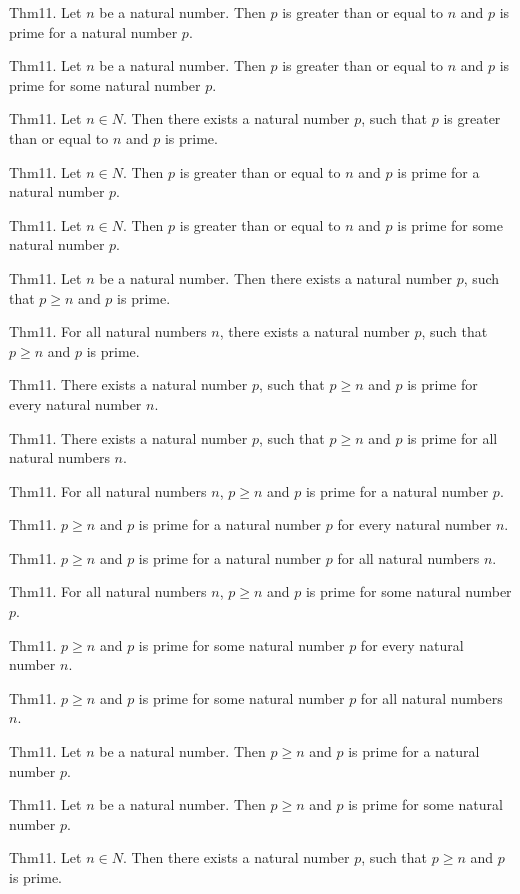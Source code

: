 \documentclass{article}
\begin{document}
Thm11. Let $n$ be a natural number. Then $p$ is greater than or equal to $n$ and $p$ is prime for a natural number $p$.

Thm11. Let $n$ be a natural number. Then $p$ is greater than or equal to $n$ and $p$ is prime for some natural number $p$.

Thm11. Let $n \in N$. Then there exists a natural number $p$, such that $p$ is greater than or equal to $n$ and $p$ is prime.

Thm11. Let $n \in N$. Then $p$ is greater than or equal to $n$ and $p$ is prime for a natural number $p$.

Thm11. Let $n \in N$. Then $p$ is greater than or equal to $n$ and $p$ is prime for some natural number $p$.

Thm11. Let $n$ be a natural number. Then there exists a natural number $p$, such that $p \geq n$ and $p$ is prime.

Thm11. For all natural numbers $n$, there exists a natural number $p$, such that $p \geq n$ and $p$ is prime.

Thm11. There exists a natural number $p$, such that $p \geq n$ and $p$ is prime for every natural number $n$.

Thm11. There exists a natural number $p$, such that $p \geq n$ and $p$ is prime for all natural numbers $n$.

Thm11. For all natural numbers $n$, $p \geq n$ and $p$ is prime for a natural number $p$.

Thm11. $p \geq n$ and $p$ is prime for a natural number $p$ for every natural number $n$.

Thm11. $p \geq n$ and $p$ is prime for a natural number $p$ for all natural numbers $n$.

Thm11. For all natural numbers $n$, $p \geq n$ and $p$ is prime for some natural number $p$.

Thm11. $p \geq n$ and $p$ is prime for some natural number $p$ for every natural number $n$.

Thm11. $p \geq n$ and $p$ is prime for some natural number $p$ for all natural numbers $n$.

Thm11. Let $n$ be a natural number. Then $p \geq n$ and $p$ is prime for a natural number $p$.

Thm11. Let $n$ be a natural number. Then $p \geq n$ and $p$ is prime for some natural number $p$.

Thm11. Let $n \in N$. Then there exists a natural number $p$, such that $p \geq n$ and $p$ is prime.
\end{document}
